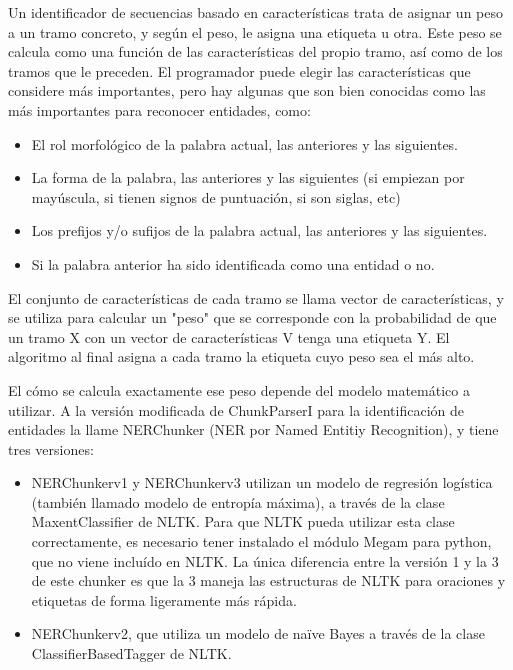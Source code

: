 \documentclass{pre-tfg}
\begin{document}
Un identificador de secuencias basado en características trata de asignar un peso a un tramo concreto, y según el peso, le asigna una etiqueta u otra. Este peso se calcula como una función de las características del propio tramo, así como de los tramos que le preceden.
El programador puede elegir las características que considere más importantes, pero hay algunas que son bien conocidas como las más importantes para reconocer entidades, como:

\begin{itemize}
	\item El rol morfológico de la palabra actual, las anteriores y las siguientes.
	\item La forma de la palabra, las anteriores y las siguientes (si empiezan por mayúscula, si tienen signos de puntuación, si son siglas, etc)
	\item Los prefijos y/o sufijos de la palabra actual, las anteriores  y las siguientes.
	\item Si la palabra anterior ha sido identificada como una entidad o no.
	
\end{itemize}

El conjunto de características de cada tramo se llama vector de características, y se utiliza para calcular un "peso" que se corresponde con la probabilidad de que un tramo X con un vector de características V tenga una etiqueta Y. El algoritmo al final asigna a cada tramo la etiqueta cuyo peso sea el más alto.

El cómo se calcula exactamente ese peso depende del modelo matemático a utilizar. A la versión modificada de ChunkParserI para la identificación de entidades la llame NERChunker (NER por Named Entitiy Recognition), y tiene tres versiones:

\begin{itemize}
	\item NERChunkerv1 y NERChunkerv3 utilizan un modelo de regresión logística (también llamado modelo de entropía máxima), a través de la clase MaxentClassifier de NLTK. Para que NLTK pueda utilizar esta clase correctamente, es necesario tener instalado el módulo Megam para python, que no viene incluído en NLTK. La única diferencia entre la versión 1 y la 3 de este chunker es que la 3 maneja las estructuras de NLTK para oraciones y etiquetas de forma ligeramente más rápida.
	\item NERChunkerv2, que utiliza un modelo de naïve Bayes a través de la clase ClassifierBasedTagger de NLTK.
	
\end{itemize}
\end{document}
